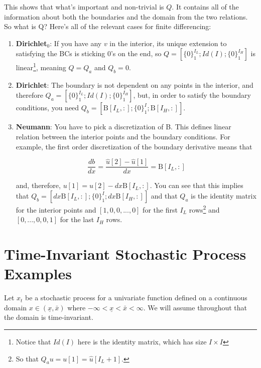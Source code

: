 \documentclass[11pt]{article}
\begin{document}
\begin{itemize}
	This shows that what's important and non-trivial is $Q$. It contains all of the information about both the boundaries and the domain from the two relations. So what is Q? Here's all of the relevant cases for finite differencing:
	\begin{enumerate}
	\item \textbf{Dirichlet$_0$}: If you have any $v$ in the interior, its unique extension to satisfying the BCs is 
			sticking $0$'s on the end, so $Q = [\{0\}_1^{I_L};Id(I); \{0\}_1^{I_H}]$ is linear\footnote{Notice that $Id(I)$ here is the identity matrix, which has size $I\times I$}, meaning $Q = Q_a$ and $Q_b=0$.
			
	\item \textbf{Dirichlet}: The boundary is not dependent on any points in the interior, and therefore $Q_a = [\{0\}_1^{I_L};Id(I);\{0\}_1^{I_H}]$, but, in order to satisfy the boundary conditions, you need $ Q_b=[\text{B}[I_L,:];\{0\}_1^I;\text{B}[I_H,:]]$.
			
	\item \textbf{Neumann}: You have to pick a discretization of B. 
			This defines linear relation between the interior points and the boundary conditions. For example, the first order discretization of the boundary derivative means that 
			
	\begin{equation}
		\frac{db}{dx} = \frac{\hat{u}[2] - \hat{u}[1]}{dx} = \text{B}[I_L,:]
	\end{equation}
			
	and, therefore, $u[1] = u[2] - dx\text{B}[I_L,:]$. You can see that this implies that $Q_b = [dx\text{B}[I_L,:];\{0\}_1^I;dx \text{B}[I_H,:]]$ and that $Q_a$ is the identity matrix for the interior points and $[1,0, 0,...,0]$ for the first $I_L$ rows\footnote{So that $Q_a u = u[1] = \hat{u}[I_L+1]$.} and $[0,...,0,0,1]$ for the last $I_H$ rows.%
			
\end{enumerate}
\end{itemize}

\section{Time-Invariant Stochastic Process Examples}
Let $x_t$ be a stochastic process for a univariate function defined on a continuous domain $x \in (\underline{x}, \bar{x})$ where $-\infty < \underline{x} < \bar{x} < \infty$.  We will assume throughout that the domain is time-invariant.
\end{document}
